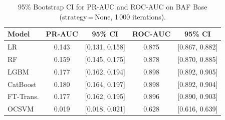 \begin{table}[ht!]
\centering
\caption{95\% Bootstrap CI for PR-AUC and ROC-AUC on BAF Base (strategy\,=\,None, 1\,000 iterations).}
\label{tab:ci_baf}
\begin{tabular}{l c c c c}
\toprule
Model & PR-AUC & 95\% CI & ROC-AUC & 95\% CI \\
\midrule
LR         & 0.143 & [0.131, 0.158] & 0.875 & [0.867, 0.882] \\
RF         & 0.159 & [0.145, 0.175] & 0.878 & [0.870, 0.885] \\
LGBM       & 0.177 & [0.162, 0.194] & 0.898 & [0.892, 0.905] \\
CatBoost   & 0.180 & [0.164, 0.197] & 0.898 & [0.892, 0.904] \\
FT-Trans.  & 0.177 & [0.162, 0.195] & 0.896 & [0.890, 0.903] \\
OCSVM      & 0.019 & [0.018, 0.021] & 0.628 & [0.616, 0.639] \\
\bottomrule
\end{tabular}
\end{table}